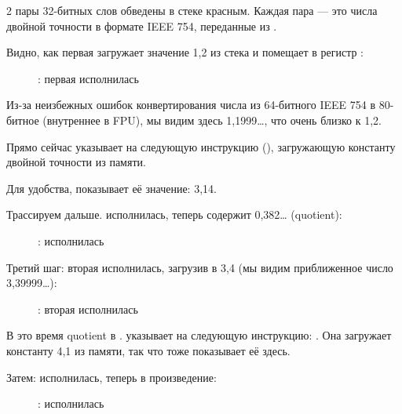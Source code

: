 ﻿\clearpage
{}
\myindex{\olly}

2 пары 32-битных слов обведены в стеке красным.
Каждая пара --- это числа двойной точности в формате IEEE 754, переданные из \main.

Видно, как первая \FLD загружает значение 1,2 из стека и помещает в регистр :

\begin{figure}[H]
\centering
{}
\caption{\olly: первая \FLD исполнилась}
\label{fig:FPU_simple_olly_1}
\end{figure}

Из-за неизбежных ошибок конвертирования числа из 64-битного IEEE 754 в 80-битное (внутреннее в FPU),
мы видим здесь 1,1999\ldots, что очень близко к 1,2.

Прямо сейчас \EIP указывает на следующую инструкцию (\FDIV), загружающую константу двойной точности 
из памяти.

Для удобства, \olly показывает её значение: 3,14.

\clearpage
Трассируем дальше. 
\FDIV исполнилась, теперь  содержит 0,382\ldots
(\gls{quotient}):

\begin{figure}[H]
\centering
{}
\caption{\olly: \FDIV исполнилась}
\label{fig:FPU_simple_olly_2}
\end{figure}

\clearpage
Третий шаг: вторая \FLD 
исполнилась, загрузив в  3,4 (мы видим приближенное число 3,39999\ldots): 

\begin{figure}[H]
\centering
{}
\caption{\olly: вторая \FLD исполнилась}
\label{fig:FPU_simple_olly_3}
\end{figure}

В это время \gls{quotient}  
в .
\EIP указывает на следующую инструкцию: \FMUL. 
Она загружает константу 4,1 из памяти, так что \olly тоже показывает её здесь.

\clearpage
Затем: \FMUL исполнилась, теперь в  произведение:

\begin{figure}[H]
\centering
{}
\caption{\olly: \FMUL исполнилась}
\label{fig:FPU_simple_olly_4}
\end{figure}

